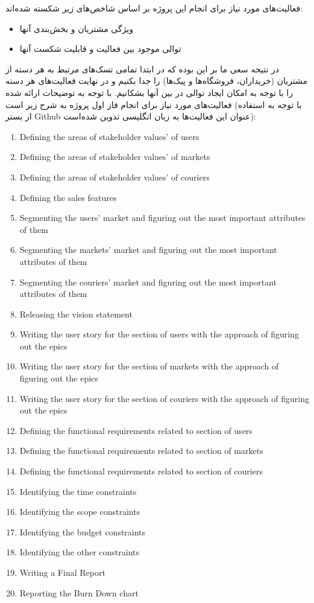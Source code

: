 \documentclass[]{article}
\begin{document}
فعالیت‌های مورد نیاز برای انجام این پروژه بر اساس شاخص‌های زیر شکسته
شده‌اند:

\begin{itemize}
\item
  ویژگی مشتریان و بخش‌بندی آنها
\item
  توالی موجود بین فعالیت و قابلیت شکست آنها
\end{itemize}

در نتیجه سعی ما بر این بوده که در ابتدا تمامی تسک‌های مرتبط به هر دسته
از مشتریان (خریداران، فروشگاه‌ها و پیک‌ها) را جدا بکنیم و در نهایت
فعالیت‌های هر دسته را با توجه به امکان ایجاد توالی در بین آنها بشکانیم.
با توجه به توضیحات ارائه شده فعالیت‌های مورد نیاز برای انجام فاز اول
پروژه به شرح زیر است (با توجه به استفاده از بستر Github عنوان این
فعالیت‌ها به زبان انگلیسی تدوین شده‌است):

\begin{enumerate}
\def\labelenumi{\arabic{enumi})}
\item
  Defining the areas of stakeholder values' of users
\item
  Defining the areas of stakeholder values' of markets
\item
  Defining the areas of stakeholder values' of couriers
\item
  Defining the sales features
\item
  Segmenting the users' market and figuring out the most important
  attributes of them
\item
  Segmenting the markets' market and figuring out the most important
  attributes of them
\item
  Segmenting the couriers' market and figuring out the most important
  attributes of them
\item
  Releasing the vision statement
\item
  Writing the user story for the section of users with the approach of
  figuring out the epics
\item
  Writing the user story for the section of markets with the approach of
  figuring out the epics
\item
  Writing the user story for the section of couriers with the approach
  of figuring out the epics
\item
  Defining the functional requirements related to section of users
\item
  Defining the functional requirements related to section of markets
\item
  Defining the functional requirements related to section of couriers
\item
  Identifying the time constraints
\item
  Identifying the scope constraints
\item
  Identifying the budget constraints
\item
  Identifying the other constraints
\item
  Writing a Final Report
\item
  Reporting the Burn Down chart
\end{enumerate}
\end{document}
